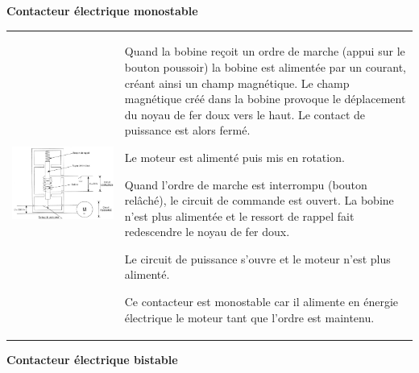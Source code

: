 \textbf{Contacteur électrique monostable}

\begin{tabular}{m{.45\linewidth}m{.45\linewidth}}

\includegraphics[width=.9\linewidth]{media/image98.png}  &

Quand la bobine reçoit un ordre de marche (appui sur
le bouton poussoir) la bobine est alimentée par un courant, créant ainsi
un champ magnétique. Le champ magnétique créé dans la bobine provoque le
déplacement du noyau de fer doux vers le haut. Le contact de puissance
est alors fermé.

Le moteur est alimenté puis mis en rotation.

Quand l'ordre de marche est interrompu (bouton relâché), le circuit de
commande est ouvert. La bobine n'est plus alimentée et le ressort de
rappel fait redescendre le noyau de fer doux.

Le circuit de puissance s'ouvre et le moteur n'est plus alimenté.

Ce contacteur est monostable car il alimente en énergie électrique le
moteur tant que l'ordre est maintenu. 

\end{tabular}

\textbf{Contacteur électrique bistable}

